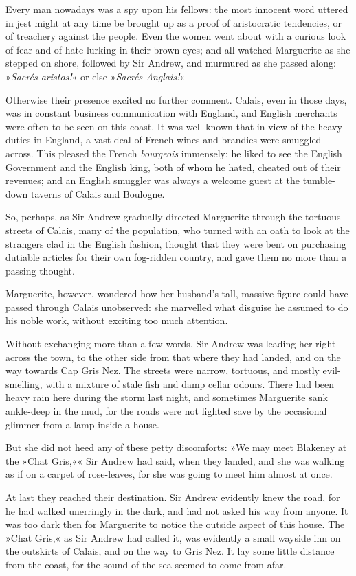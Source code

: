 Every man nowadays was a spy upon his fellows: the most innocent word uttered in jest might at any time be brought up as a proof of aristocratic tendencies, or of treachery against the people. Even the women went about with a curious look of fear and of hate lurking in their brown eyes; and all watched Marguerite as she stepped on shore, followed by Sir Andrew, and murmured as she passed along: »\textit{Sacrés aristos!}« or else »\textit{Sacrés Anglais!}«

Otherwise their presence excited no further comment. Calais, even in those days, was in constant business communication with England, and English merchants were often to be seen on this coast. It was well known that in view of the heavy duties in England, a vast deal of French wines and brandies were smuggled across. This pleased the French \textit{bourgeois} immensely; he liked to see the English Government and the English king, both of whom he hated, cheated out of their revenues; and an English smuggler was always a welcome guest at the tumble-down taverns of Calais and Boulogne.

So, perhaps, as Sir Andrew gradually directed Marguerite through the tortuous streets of Calais, many of the population, who turned with an oath to look at the strangers clad in the English fashion, thought that they were bent on purchasing dutiable articles for their own fog-ridden country, and gave them no more than a passing thought.

Marguerite, however, wondered how her husband's tall, massive figure could have passed through Calais unobserved: she marvelled what disguise he assumed to do his noble work, without exciting too much attention.

Without exchanging more than a few words, Sir Andrew was leading her right across the town, to the other side from that where they had landed, and on the way towards Cap Gris Nez. The streets were narrow, tortuous, and mostly evil-smelling, with a mixture of stale fish and damp cellar odours. There had been heavy rain here during the storm last night, and sometimes Marguerite sank ankle-deep in the mud, for the roads were not lighted save by the occasional glimmer from a lamp inside a house.

But she did not heed any of these petty discomforts: »We may meet Blakeney at the »Chat Gris,«« Sir Andrew had said, when they landed, and she was walking as if on a carpet of rose-leaves, for she was going to meet him almost at once.

At last they reached their destination. Sir Andrew evidently knew the road, for he had walked unerringly in the dark, and had not asked his way from anyone. It was too dark then for Marguerite to notice the outside aspect of this house. The »Chat Gris,« as Sir Andrew had called it, was evidently a small wayside inn on the outskirts of Calais, and on the way to Gris Nez. It lay some little distance from the coast, for the sound of the sea seemed to come from afar.

